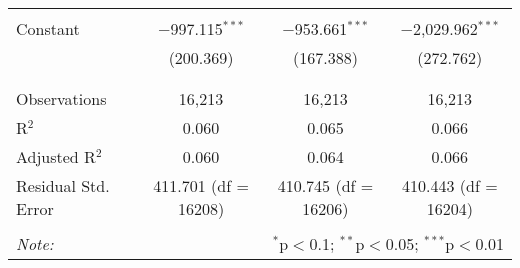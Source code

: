 \begin{table}[!htbp]
\begin{tabular}{@{\extracolsep{5pt}}lccc}
  & & & \\ 
 Constant & $-$997.115$^{***}$ & $-$953.661$^{***}$ & $-$2,029.962$^{***}$ \\ 
  & (200.369) & (167.388) & (272.762) \\ 
  & & & \\ 
\hline \\[-1.8ex] 
Observations & 16,213 & 16,213 & 16,213 \\ 
R$^{2}$ & 0.060 & 0.065 & 0.066 \\ 
Adjusted R$^{2}$ & 0.060 & 0.064 & 0.066 \\ 
Residual Std. Error & 411.701 (df = 16208) & 410.745 (df = 16206) & 410.443 (df = 16204) \\ 
\hline 
\hline \\[-1.8ex] 
\textit{Note:}  & \multicolumn{3}{r}{$^{*}$p$<$0.1; $^{**}$p$<$0.05; $^{***}$p$<$0.01} \\ 
\end{tabular} 
\end{table} 
